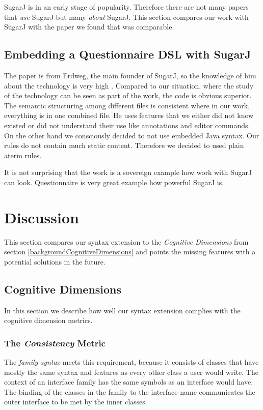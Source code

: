\documentclass{report}
\begin{document}
SugarJ is in an early stage of popularity. Therefore there are not many papers that \emph{use} SugarJ but many \emph{about} SugarJ. This section compares our work with SugarJ with the paper we found that was comparable.

\subsection{Embedding a Questionnaire DSL with SugarJ}

The paper is from Erdweg, the main founder of SugarJ, so the knowledge of him about the technology is very high \cite{Erdweg-Questionnaire-2013}. Compared to our situation, where the study of the technology can be seen as part of the work, the code is obvious superior. The semantic structuring among different files is consistent where in our work, everything is in one combined file. He uses features that we either did not know existed or did not understand their use like annotations and editor commands. On the other hand we consciously decided to not use embedded Java syntax. Our rules do not contain much static content. Therefore we decided to used plain aterm rules.

It is not surprising that the work is a sovereign example how work with SugarJ can look. Questionnaire is very great example how powerful SugarJ is.


\section{Discussion}

This section compares our syntax extension to the \emph{Cognitive Dimensions} from section \ref{backgroundCognitiveDimensions} and points the missing features with a potential solutions in the future.

\subsection{Cognitive Dimensions}

In this section we describe how well our syntax extension complies with the cognitive dimension metrics.

\subsubsection*{The \emph{Consistency} Metric}

The \emph{family syntax} meets this requirement, because it consists of classes that have mostly the same syntax and features as every other class a user would write. The context of an interface family has the same symbols as an interface would have. The binding of the classes in the family to the interface name communicates the outer interface to be met by the inner classes.
\end{document}
